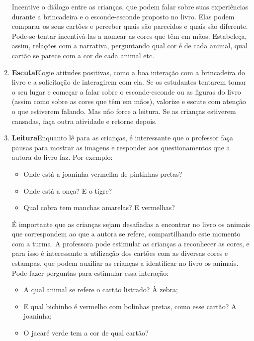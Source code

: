 \documentclass[11pt]{extarticle}
\begin{document}
\begin{enumerate}
Incentive o diálogo entre as crianças, que podem falar sobre suas experiências durante a brincadeira e o esconde-esconde proposto no livro.
Elas podem comparar os seus cartões e perceber quais são parecidos e quais são diferente. Pode-se tentar incentivá-las a nomear as cores que têm em mãos.
Estabeleça, assim, relações com a narrativa, perguntando qual cor é de cada animal, qual cartão se parece com a cor de cada animal etc.

\item \textbf{Escuta}\quad Elogie atitudes positivas, como 
a boa interação com a brincadeira do livro e a solicitação de interagirem com ela. Se os estudantes tentarem 
tomar o seu lugar e começar a falar sobre o esconde-esconde ou as figuras do livro (assim como sobre as cores que têm em mãos), valorize e escute com atenção o que estiverem falando. Mas não  force a leitura. Se as crianças estiverem cansadas, faça outra atividade 
e retorne depois. 

\item \textbf{Leitura}\quad Enquanto lê para as crianças, é interessante que o professor faça pausas para mostrar as imagens e responder aos questionamentos que a autora do livro faz. Por exemplo:

\begin{itemize}
\item Onde está a joaninha vermelha de pintinhas pretas?
\item Onde está a onça? E o tigre?
\item Qual cobra tem manchas amarelas? E vermelhas?
\end{itemize}

É importante que as crianças sejam desafiadas a encontrar no livro os animais que correspondem ao que a autora se refere, compartilhando este momento com a turma. A professora pode estimular as crianças a reconhecer as cores, e para isso é interessante a utilização dos cartões com as diversas cores e estampas, que podem auxiliar as crianças a identificar no livro os animais. 
Pode fazer perguntas para estimular essa interação:


\begin{itemize}
\item A qual animal se refere o cartão listrado? À zebra;
\item E qual bichinho é vermelho com bolinhas pretas, como esse cartão? A joaninha; 
\item O jacaré verde tem a cor de qual cartão?
\end{itemize}


\end{enumerate}
\end{document}
